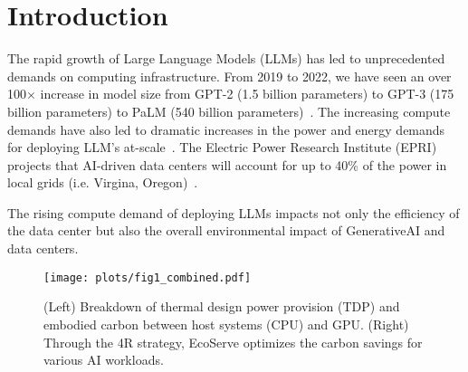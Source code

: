 \section{Introduction}

The rapid growth of Large Language Models (LLMs) has led to unprecedented demands on computing infrastructure.
From 2019 to 2022, we have seen an over 100$\times$ increase in model size from GPT-2 (1.5 billion parameters) to GPT-3 (175 billion parameters) to PaLM (540 billion parameters)~\cite{chowdhery2023palm}.
The increasing compute demands have also led to dramatic increases in the power and energy demands for deploying LLM's at-scale~\cite{tschand2024mlperf, luccioni2024power}.
The Electric Power Research Institute (EPRI) projects that AI-driven data centers will account for up to 40\% of the power in local grids (i.e. Virgina, Oregon)~\cite{epri2024}.

The rising compute demand of deploying LLMs impacts not only the efficiency of the data center but also the overall environmental impact of GenerativeAI and data centers.

\begin{figure}[t]
    \hspace{-0.2in}
         \centering
 \texttt{[image: plots/fig1\_combined.pdf]}
 \vspace{-1em}
     \caption{(Left) Breakdown of thermal design power provision (TDP) and embodied carbon between host systems (CPU) and GPU. (Right) Through the 4R strategy, EcoServe optimizes the carbon savings for various AI workloads.}
     \label{fig:motivation}
     \vspace{-1em} 
 \end{figure}





















